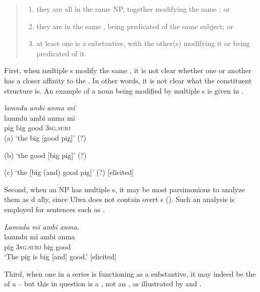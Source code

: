 \begin{quote}
\begin{enumerate}[noitemsep, label={(\roman*)}, align=left, widest=190, labelsep=1ex,leftmargin=*]
\item they are all in the same NP, together modifying the same ; or
\item they are in the same , being predicated of the same subject; or
\item at least one is a substantive, with the other(s) modifying it or being predicated of it.
\end{enumerate}
\end{quote}

  First, when multiple s modify the same , it is not clear whether one or another  has a closer affinity to the . In other words, it is not clear what the constituent structure is. An example of a noun being modified by multiple s is given in .

\ea%
    \label{ex:phrase:106}
          \textit{lamndu ambi anma mï}\\
\gll    lamndu  ambi  anma  mï\\
    pig      big    good  3\textsc{sg.subj}\\
\glt    (a) ‘the big [good pig]’ (?)

    (b) ‘the good [big pig]’ (?)

    (c) ‘the [big (and) good pig]’ (?) [elicited]
\z

Second, when an NP has multiple s, it may be most parsimonious to analyze them as d ally, since Ulwa does not contain overt s (). Such an analysis is employed for sentences such as .

\ea%
    \label{ex:phrase:107}
          \textit{Lamndu mï ambi anma.}\\
\gll    lamndu  mï      ambi  anma\\
    pig      3\textsc{sg.subj}  big    good\\
\glt `The pig is big [and] good.’ [elicited]
\z

Third, when one  in a series is functioning as a substantive, it may indeed be the  of a  -- but this  in question is a , not an , as illustrated by  and .

